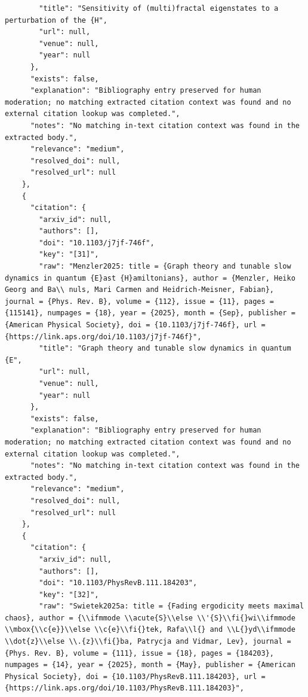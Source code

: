 \documentclass[11pt]{article}
\begin{document}
\begin{verbatim}
        "title": "Sensitivity of (multi)fractal eigenstates to a perturbation of the {H",
        "url": null,
        "venue": null,
        "year": null
      },
      "exists": false,
      "explanation": "Bibliography entry preserved for human moderation; no matching extracted citation context was found and no external citation lookup was completed.",
      "notes": "No matching in-text citation context was found in the extracted body.",
      "relevance": "medium",
      "resolved_doi": null,
      "resolved_url": null
    },
    {
      "citation": {
        "arxiv_id": null,
        "authors": [],
        "doi": "10.1103/j7jf-746f",
        "key": "[31]",
        "raw": "Menzler2025: title = {Graph theory and tunable slow dynamics in quantum {E}ast {H}amiltonians}, author = {Menzler, Heiko Georg and Ba\\ nuls, Mari Carmen and Heidrich-Meisner, Fabian}, journal = {Phys. Rev. B}, volume = {112}, issue = {11}, pages = {115141}, numpages = {18}, year = {2025}, month = {Sep}, publisher = {American Physical Society}, doi = {10.1103/j7jf-746f}, url = {https://link.aps.org/doi/10.1103/j7jf-746f}",
        "title": "Graph theory and tunable slow dynamics in quantum {E",
        "url": null,
        "venue": null,
        "year": null
      },
      "exists": false,
      "explanation": "Bibliography entry preserved for human moderation; no matching extracted citation context was found and no external citation lookup was completed.",
      "notes": "No matching in-text citation context was found in the extracted body.",
      "relevance": "medium",
      "resolved_doi": null,
      "resolved_url": null
    },
    {
      "citation": {
        "arxiv_id": null,
        "authors": [],
        "doi": "10.1103/PhysRevB.111.184203",
        "key": "[32]",
        "raw": "Swietek2025a: title = {Fading ergodicity meets maximal chaos}, author = {\\ifmmode \\acute{S}\\else \\'{S}\\fi{}wi\\ifmmode \\mbox{\\c{e}}\\else \\c{e}\\fi{}tek, Rafa\\l{} and \\L{}yd\\ifmmode \\dot{z}\\else \\.{z}\\fi{}ba, Patrycja and Vidmar, Lev}, journal = {Phys. Rev. B}, volume = {111}, issue = {18}, pages = {184203}, numpages = {14}, year = {2025}, month = {May}, publisher = {American Physical Society}, doi = {10.1103/PhysRevB.111.184203}, url = {https://link.aps.org/doi/10.1103/PhysRevB.111.184203}",

\end{verbatim}
\end{document}
